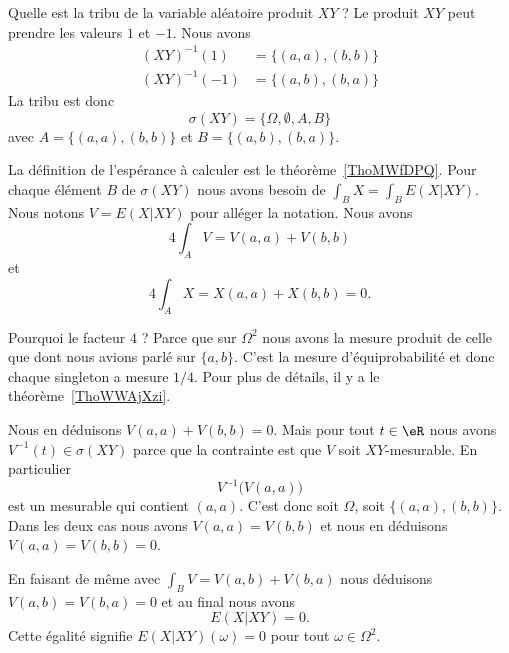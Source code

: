 \begin{subproof}

	Quelle est la tribu de la variable aléatoire produit \( XY\) ? Le produit \( XY\) peut prendre les valeurs \( 1\) et \( -1\). Nous avons
	\begin{subequations}
		\begin{align}
			(XY)^{-1}(1)  & =\{ (a,a),(b,b) \} \\
			(XY)^{-1}(-1) & =\{ (a,b),(b,a) \}
		\end{align}
	\end{subequations}
	La tribu est donc
	\begin{equation}
		\sigma(XY)=\{  \Omega,\emptyset, A,B  \}
	\end{equation}
	avec \( A=\{ (a,a),(b,b) \}\) et \( B=\{ (a,b),(b,a) \}\).

	\spitem[Calcul de \( E(X|XY)\)]

	La définition de l'espérance à calculer est le théorème~\ref{ThoMWfDPQ}. Pour chaque élément \( B\) de \( \sigma(XY)\) nous avons besoin de \( \int_BX=\int_B E(X|XY)\). Nous notons \( V=E(X|XY)\) pour alléger la notation. Nous avons
	\begin{equation}
		4\int_AV=V(a,a)+V(b,b)
	\end{equation}
	et
	\begin{equation}
		4\int_AX=X(a,a)+X(b,b)=0.
	\end{equation}

	Pourquoi le facteur \( 4\) ? Parce que sur \( \Omega^2\) nous avons la mesure produit de celle que dont nous avions parlé sur \( \{ a,b \}\). C'est la mesure d'équiprobabilité et donc chaque singleton a mesure \( 1/4\). Pour plus de détails, il y a le théorème~\ref{ThoWWAjXzi}.

	Nous en déduisons \( V(a,a)+V(b,b)=0\). Mais pour tout \( t\in \eR\) nous avons \( V^{-1}(t)\in \sigma(XY)\) parce que la contrainte est que \( V\) soit \( XY\)-mesurable. En particulier
	\begin{equation}
		V^{-1}\big( V(a,a) \big)
	\end{equation}
	est un mesurable qui contient \( (a,a)\). C'est donc soit \( \Omega\), soit \( \{ (a,a),(b,b) \}\). Dans les deux cas nous avons \( V(a,a)=V(b,b)\) et nous en déduisons \( V(a,a)=V(b,b)=0\).

	En faisant de même avec \( \int_BV=V(a,b)+V(b,a)\) nous déduisons \( V(a,b)=V(b,a)=0\) et au final nous avons
	\begin{equation}
		E(X|XY)=0.
	\end{equation}
	Cette égalité signifie \( E(X|XY)(\omega)=0\) pour tout \( \omega\in \Omega^2\).


\end{subproof}
